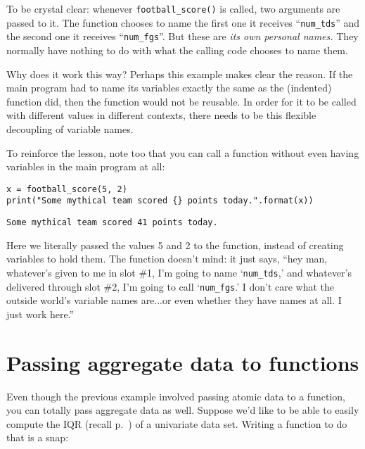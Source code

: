 To be crystal clear: whenever \texttt{football\_score()} is called, two
arguments are passed to it. The function chooses to name the first one it
receives ``\texttt{num\_tds}'' and the second one it receives
``\texttt{num\_fgs}''. But these are \textit{its own personal names.} They
normally have nothing to do with what the calling code chooses to name them.

Why does it work this way? Perhaps this example makes clear the reason. If the
main program had to name its variables exactly the same as the (indented)
function did, then the function would not be reusable. In order for it to be
called with different values in different contexts, there needs to be this
flexible decoupling of variable names.

To reinforce the lesson, note too that you can call a function without even
having variables in the main program at all:

\begin{Verbatim}[fontsize=\footnotesize,samepage=true,frame=single,framesep=3mm]
x = football_score(5, 2)
print("Some mythical team scored {} points today.".format(x))
\end{Verbatim}
\vspace{-.2in}

\begin{Verbatim}[fontsize=\small,samepage=true,frame=leftline,framesep=5mm,framerule=1mm]
Some mythical team scored 41 points today.
\end{Verbatim}

Here we literally passed the values 5 and 2 to the function, instead of
creating variables to hold them. The function doesn't mind: it just says, ``hey
man, whatever's given to me in slot \#1, I'm going to name `\texttt{num\_tds},'
and whatever's delivered through slot \#2, I'm going to call
`\texttt{num\_fgs}.' I don't care what the outside world's variable names
are...or even whether they have names at all. I just work here.''

\section{Passing aggregate data to functions}


Even though the previous example involved passing atomic data to a function,
you can totally pass aggregate data as well. Suppose we'd like to be able to
easily compute the IQR (recall p.~\pageref{IQR}) of a univariate data set.
Writing a function to do that is a snap:

